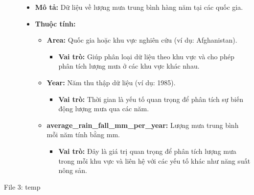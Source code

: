 \begin{description}
    \begin{itemize}
        \item \textbf{Mô tả:} Dữ liệu về lượng mưa trung bình hàng năm tại các quốc gia.
        \item \textbf{Thuộc tính:}
        \begin{itemize}
            \item \textbf{Area:} Quốc gia hoặc khu vực nghiên cứu (ví dụ: Afghanistan).
            \begin{itemize}
                \item \textbf{Vai trò:} Giúp phân loại dữ liệu theo khu vực và cho phép phân tích lượng mưa ở các khu vực khác nhau.
            \end{itemize}
            \item \textbf{Year:} Năm thu thập dữ liệu (ví dụ: 1985).
            \begin{itemize}
                \item \textbf{Vai trò:} Thời gian là yếu tố quan trọng để phân tích sự biến động lượng mưa qua các năm.
            \end{itemize}
            \item \textbf{average\_rain\_fall\_mm\_per\_year:} Lượng mưa trung bình mỗi năm tính bằng mm.
            \begin{itemize}
                \item \textbf{Vai trò:} Đây là giá trị quan trọng để phân tích lượng mưa trong mỗi khu vực và liên hệ với các yếu tố khác như năng suất nông sản.
            \end{itemize}
        \end{itemize}
    \end{itemize}

    \item[File 3: temp]


\end{description}
